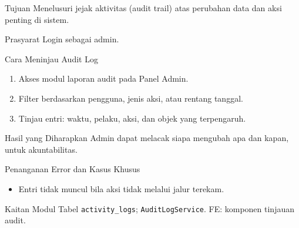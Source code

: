 
\begin{flowsection}{Tujuan}
Menelusuri jejak aktivitas (audit trail) atas perubahan data dan aksi penting di
sistem.
\end{flowsection}

\begin{flowsection}{Prasyarat}
Login sebagai admin.
\end{flowsection}

\begin{flowsection}{Cara Meninjau Audit Log}
\begin{enumerate}
  \item Akses modul laporan audit pada Panel Admin.
  \item Filter berdasarkan pengguna, jenis aksi, atau rentang tanggal.
  \item Tinjau entri: waktu, pelaku, aksi, dan objek yang terpengaruh.
\end{enumerate}
\end{flowsection}


\begin{flowsection}{Hasil yang Diharapkan}
Admin dapat melacak siapa mengubah apa dan kapan, untuk akuntabilitas.
\end{flowsection}

\begin{flowsection}{Penanganan Error dan Kasus Khusus}
\begin{itemize}
  \item Entri tidak muncul bila aksi tidak melalui jalur terekam.
\end{itemize}
\end{flowsection}

\begin{flowsection}{Kaitan Modul}
Tabel \texttt{activity\_logs}; \texttt{AuditLogService}. FE: komponen tinjauan audit.
\end{flowsection}

